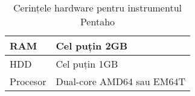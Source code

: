 



\begin{table}[!ht]
\centering
\caption{Cerințele hardware pentru instrumentul Pentaho}
\label{hardware}
\begin{tabular}{|l|l|}
\hline
RAM      & Cel puțin 2GB             \\ \hline
HDD      & Cel puțin 1GB             \\ \hline
Procesor & Dual-core AMD64 sau EM64T \\ \hline
\end{tabular}
\end{table}




\clearpage